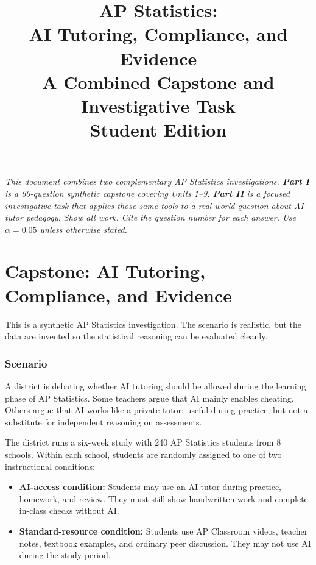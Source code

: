 \documentclass[11pt]{article}
\title{\bfseries AP Statistics:\\ AI Tutoring, Compliance, and Evidence \\[0.4em]
\large A Combined Capstone and Investigative Task \\[0.2em]
\normalsize Student Edition}
\author{}
\date{}
\begin{document}
\maketitle
\thispagestyle{empty}

\begin{center}
\begin{minipage}{0.85\textwidth}
\itshape
This document combines two complementary AP Statistics investigations.
\textbf{Part I} is a 60-question synthetic capstone covering Units 1--9.
\textbf{Part II} is a focused investigative task that applies those same
tools to a real-world question about AI-tutor pedagogy. Show all work.
Cite the question number for each answer. Use $\alpha = 0.05$ unless
otherwise stated.
\end{minipage}
\end{center}

\vspace{1em}
\tableofcontents
\newpage

\part{Capstone: AI Tutoring, Compliance, and Evidence}

\begin{notebox}
This is a synthetic AP Statistics investigation. The scenario is
realistic, but the data are invented so the statistical reasoning can
be evaluated cleanly.
\end{notebox}

\section{Scenario}

A district is debating whether AI tutoring should be allowed during the
learning phase of AP Statistics. Some teachers argue that AI mainly
enables cheating. Others argue that AI works like a private tutor:
useful during practice, but not a substitute for independent reasoning
on assessments.

The district runs a six-week study with 240 AP Statistics students
from 8 schools. Within each school, students are randomly assigned to
one of two instructional conditions:

\begin{itemize}[leftmargin=*]
  \item \textbf{AI-access condition:} Students may use an AI tutor
  during practice, homework, and review. They must still show
  handwritten work and complete in-class checks without AI.
  \item \textbf{Standard-resource condition:} Students use AP
  Classroom videos, teacher notes, textbook examples, and ordinary
  peer discussion. They may not use AI during the study period.
\end{itemize}
\end{document}
